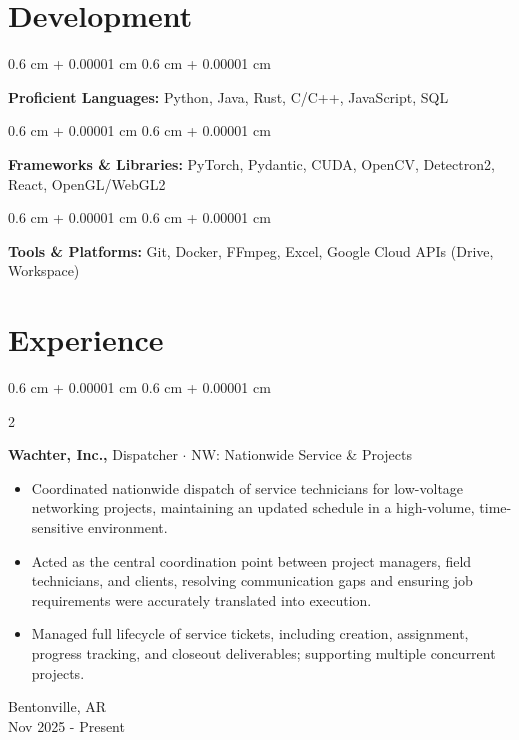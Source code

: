\documentclass[10pt, letterpaper]{article}
\newenvironment{highlights}{
    \begin{itemize}[
        topsep=0.10 cm,
        parsep=0.10 cm,
        partopsep=0pt,
        itemsep=0pt,
        leftmargin=0.4 cm + 10pt
    ]
}{
    \end{itemize}
} %
\newenvironment{onecolentry}{
    \begin{adjustwidth}{
        0.6 cm + 0.00001 cm
    }{
        0.6 cm + 0.00001 cm
    }
}{
    \end{adjustwidth}
} %
\newenvironment{twocolentry}[2][]{
    \onecolentry
    \def\secondColumn{#2}
    \setcolumnwidth{\fill,4 cm}
    \begin{paracol}{2}
}{
    \switchcolumn \raggedleft \secondColumn
    \end{paracol}
    \endonecolentry
} %
\begin{document}
    

    \section{Development}
        \begin{onecolentry}
            \textbf{Proficient Languages:} Python, Java, Rust, C/C++, JavaScript, SQL
        \end{onecolentry}

        \vspace{0.1 cm}

        \begin{onecolentry}
            \textbf{Frameworks \& Libraries:} PyTorch, Pydantic, CUDA, OpenCV, Detectron2, React, OpenGL/WebGL2
        \end{onecolentry}

        \vspace{0.1 cm}

        \begin{onecolentry}
            \textbf{Tools \& Platforms: }  Git, Docker, FFmpeg, Excel, Google Cloud APIs (Drive, Workspace)
        \end{onecolentry}

        \vspace{0.1 cm}
        
    
    \section{Experience}
        \begin{twocolentry} {
                Bentonville, AR\\
                Nov 2025 - Present
            }
            \textbf{Wachter, Inc.,}\; Dispatcher $\cdot$ NW: Nationwide Service \& Projects
            \begin{highlights}
                \item {Coordinated nationwide dispatch of service technicians for low-voltage networking projects, maintaining an updated schedule in a high-volume, time-sensitive environment.}
                \item {Acted as the central coordination point between project managers, field technicians, and clients, resolving communication gaps and ensuring job requirements were accurately translated into execution.}
                \item {Managed full lifecycle of service tickets, including creation, assignment, progress tracking, and closeout deliverables; supporting multiple concurrent projects.}
            \end{highlights}
        \end{twocolentry}
    
\end{document}
